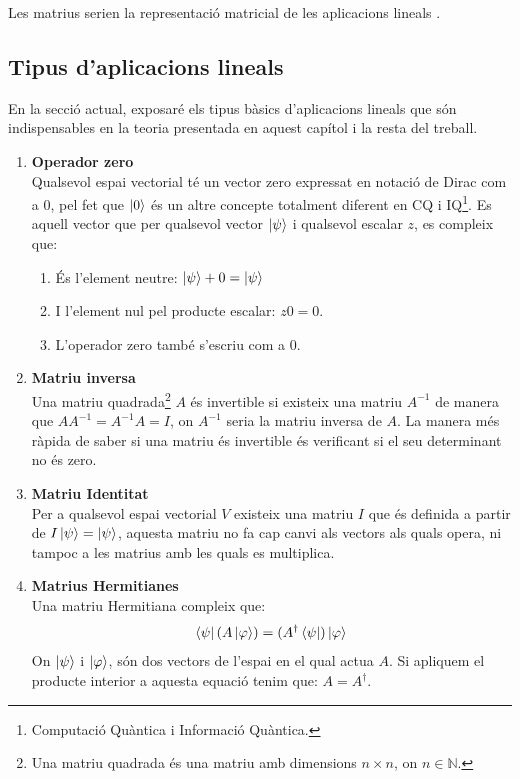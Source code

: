 Les matrius serien la representació matricial de les aplicacions lineals \cite{LR_done_right:matrix}.

\subsection{Tipus d'aplicacions lineals}
En la secció actual, exposaré els tipus bàsics d'aplicacions lineals que són indispensables en la teoria presentada en aquest capítol i la resta del treball.

\begin{enumerate}
	\item \textbf{Operador zero} \\
	Qualsevol espai vectorial té un vector zero expressat en notació de Dirac com a $0$, pel fet que $\ket{0}$ és un altre concepte totalment diferent en CQ i IQ\footnote{Computació Quàntica i Informació Quàntica.}. Es aquell vector que per qualsevol vector $\ket{\psi}$ i qualsevol escalar $z$, es compleix que: 
	\begin{enumerate}
		\item És l'element neutre: $\ket{\psi} + 0 = \ket{\psi} $
		\item I l'element nul pel producte escalar: $z0 = 0$. 
		\item L'operador zero també s'escriu com a $0$.
	\end{enumerate}
	
	
	\item \textbf{Matriu inversa} \\
	Una matriu quadrada\footnote{Una matriu quadrada és una matriu amb dimensions $n\times n$, on $n \in \mathbb{N}$.} $A$ és invertible si existeix una matriu $A^{-1}$ de manera que $AA^{-1}=A^{-1}A = I$, on $A^{-1}$ seria la matriu inversa de $A$. La manera més ràpida de saber si una matriu és invertible és verificant si el seu determinant no és zero.

	\item \textbf{Matriu Identitat} \\
	Per a qualsevol espai vectorial $V$ existeix una matriu $I$ que és definida a partir de $I\ket{\psi} = \ket{\psi}$, aquesta matriu no fa cap canvi als vectors als quals opera, ni tampoc a les matrius amb les quals es multiplica.
	
	\item \textbf{Matrius Hermitianes} \\
	Una matriu Hermitiana compleix que: 
	$$
	\bra{\psi} (A \ket{\varphi}) = (A^\dagger\bra{\psi})\ket{\varphi}
	$$
	On $\ket{\psi}$ i $\ket{\varphi}$, són dos vectors de l'espai en el qual actua $A$. Si apliquem el producte interior a aquesta equació tenim que: $A = A^\dagger$.
	

\end{enumerate}
